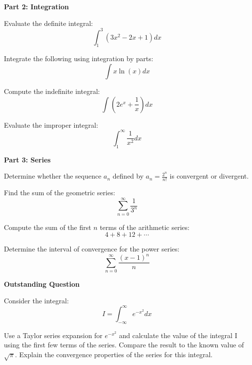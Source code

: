 \documentclass[12pt,letterpaper,answers]{exam}
\begin{document}
\newpage

\textbf{Part 2: Integration} \\

\begin{questions}
\question Evaluate the definite integral: $$\int_1^3 (3x^2 - 2x + 1) dx$$

\question Integrate the following using integration by parts: $$\int x \ln{(x)} dx$$

\question Compute the indefinite integral: $$\int \left(2e^x + \frac{1}{x} \right) dx$$

\question Evaluate the improper integral: $$\int_{1}^{\infty} \frac{1}{x^2} dx$$
\end{questions}

\newpage

\textbf{Part 3: Series} \\

\begin{questions}
\question Determine whether the sequence $a_n$ defined by $a_n = \frac{2^n}{n!}$ is convergent or divergent.

\question Find the sum of the geometric series: $$\sum_{n=0}^{\infty} \frac{1}{3^n}$$

\question Compute the sum of the first $n$ terms of the arithmetic series: $$4 + 8 + 12 + \cdots$$

\question Determine the interval of convergence for the power series: $$\sum_{n=0}^{\infty} \frac{(x-1)^n}{n}$$

\end{questions}

\newpage

\textbf{Outstanding Question} \\

\begin{questions}
\question Consider the integral: $$I = \int_{-\infty}^{\infty} e^{-x^2} dx$$

Use a Taylor series expansion for $e^{-x^2}$ and calculate the  value of the integral I using the first few terms of the series. Compare the result to the known value of $\sqrt{\pi}$. Explain the convergence properties of the series for this integral.

\end{questions}
\end{document}
